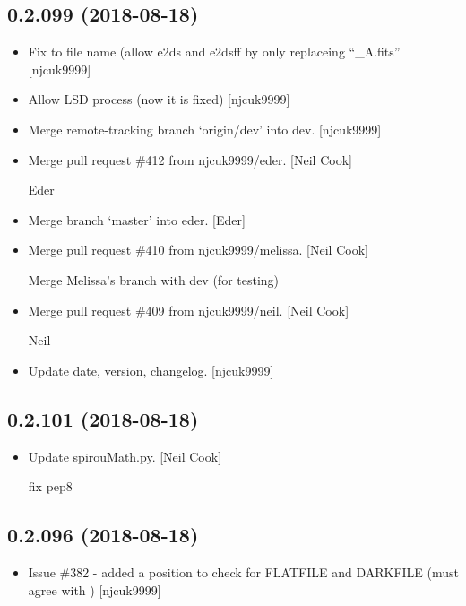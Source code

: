 \documentclass[a4paper,10pt,english]{report}
\begin{document}
\subsection{0.2.099 (2018-08-18)}
\label{\detokenize{misc/changelog:id360}}\begin{itemize}
\item {} 
Fix to file name (allow e2ds and e2dsff by only replaceing “\_A.fits”
{[}njcuk9999{]}

\item {} 
Allow LSD process (now it is fixed) {[}njcuk9999{]}

\item {} 
Merge remote-tracking branch ‘origin/dev’ into dev. {[}njcuk9999{]}

\item {} 
Merge pull request \#412 from njcuk9999/eder. {[}Neil Cook{]}

Eder

\item {} 
Merge branch ‘master’ into eder. {[}Eder{]}

\item {} 
Merge pull request \#410 from njcuk9999/melissa. {[}Neil Cook{]}

Merge Melissa’s branch with dev (for testing)

\item {} 
Merge pull request \#409 from njcuk9999/neil. {[}Neil Cook{]}

Neil

\item {} 
Update date, version, changelog. {[}njcuk9999{]}

\end{itemize}


\subsection{0.2.101 (2018-08-18)}
\label{\detokenize{misc/changelog:id361}}\begin{itemize}
\item {} 
Update spirouMath.py. {[}Neil Cook{]}

fix pep8

\end{itemize}


\subsection{0.2.096 (2018-08-18)}
\label{\detokenize{misc/changelog:id362}}\begin{itemize}
\item {} 
Issue \#382 - added a position to check for FLATFILE and DARKFILE (must
agree with ) {[}njcuk9999{]}

\end{itemize}
\end{document}
